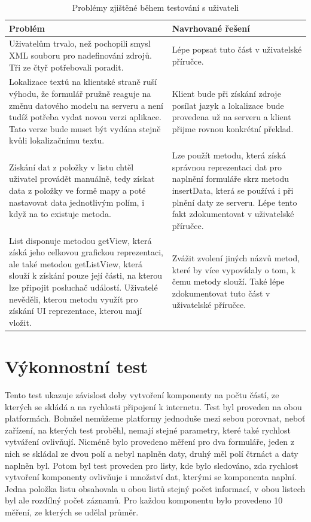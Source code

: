 \begin{table}[h!]
\begin{center}
\caption{Problémy zjištěné během testování s uživateli}
\label{table:testIssues}
\begin{tabular}{|p{7cm}|p{7cm}|}
\hline
\textbf{Problém} & \textbf{Navrhované řešení} \\
\hline
Uživatelům trvalo, než pochopili smysl XML souboru pro nadefinování zdrojů. Tři ze čtyř potřebovali poradit. & Lépe popsat tuto část v uživatelské příručce. \\
\hline
Lokalizace textů na klientské straně ruší výhodu, že formulář pružně reaguje na změnu datového modelu na serveru a není tudíž potřeba vydat novou verzi aplikace. Tato verze bude muset být vydána stejně kvůli lokalizačnímu textu. & Klient bude při získání zdroje posílat jazyk a lokalizace bude provedena už na serveru a klient přijme rovnou konkrétní překlad. \\
\hline
Získání dat z položky v listu chtěl uživatel provádět manuálně, tedy získat data z položky ve formě mapy a poté nastavovat data jednotlivým polím, i když na to existuje metoda. & Lze použít metodu, která získá správnou reprezentaci dat pro naplnění formuláře skrz metodu insertData, která se používá i při plnění daty ze serveru. Lépe tento fakt zdokumentovat v uživatelské příručce. \\
\hline
List disponuje metodou getView, která získá jeho celkovou grafickou reprezentaci, ale také metodou getListView, která slouží k získání pouze její části, na kterou lze připojit posluchač událostí. Uživatelé nevěděli, kterou metodu využít pro získání UI reprezentace, kterou mají vložit. & Zvážit zvolení jiných názvů metod, které by více vypovídaly o tom, k čemu metody slouží. Také lépe zdokumentovat tuto část v uživatelské příručce. \\
\hline
\end{tabular}
\end{center}
\end{table}

\section{Výkonnostní test} 
Tento test ukazuje závislost doby vytvoření komponenty na počtu částí, ze kterých se skládá a na rychlosti připojení k internetu. Test byl proveden na obou platformách. Bohužel nemůžeme platformy jednoduše mezi sebou porovnat, neboť zařízení, na kterých test proběhl, nemají stejné parametry, které také rychlost vytváření ovlivňují. Nicméně bylo provedeno měření pro dva formuláře, jeden z nich se skládal ze dvou polí a nebyl naplněn daty, druhý měl polí čtrnáct a daty naplněn byl. Potom byl test proveden pro listy, kde bylo sledováno, zda rychlost vytvoření komponenty ovlivňuje i množství dat, kterými se komponenta naplní. Jedna položka listu obsahovala u obou listů stejný počet informací, v obou listech byl ale rozdílný počet záznamů. Pro každou komponentu bylo provedeno 10 měření, ze kterých se udělal průměr. 

